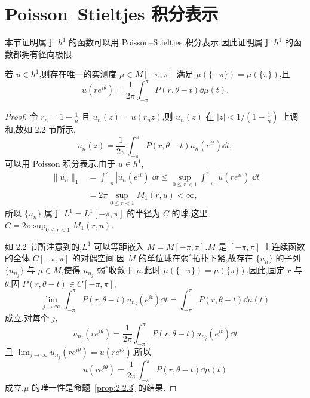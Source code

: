 \section{Poisson--Stieltjes 积分表示}\label{sec:2.4}

本节证明属于 $h^{1}$ 的函数可以用 Poisson--Stieltjes 积分表示.因此证明属于 $h^{1}$ 的函数都拥有径向极限.

\begin{theorem}\label{thm:2.4.1}
若 $u \in h^{1}$,则存在唯一的实测度 $\mu \in M[-\pi, \pi]$ 满足 $\mu(\{-\pi\}) = \mu(\{\pi\})$,且
\begin{equation*}
u(re^{i\theta}) = \frac{1}{2\pi}\int_{-\pi}^{\pi}P(r, \theta - t)\dd\mu(t).
\end{equation*}
\end{theorem}

\begin{proof}
令 $r_{n} = 1 - \frac{1}{n}$ 且 $u_{n}(z) = u(r_{n}z)$,则 $u_{n}(z)$ 在 $|z| < 1/(1 - \frac{1}{n})$ 上调和,故如 2.2 节所示,
\begin{equation*}
u_{n}(z) = \frac{1}{2\pi}\int_{-\pi}^{\pi}P(r, \theta - t)u_{n}(e^{it})\dd t,
\end{equation*}
可以用 Poisson 积分表示.由于 $u \in h^{1}$,
\begin{align*}
\|u_{n}\|_{1} & = \int_{-\pi}^{\pi}|u_{n}(e^{it})|\dd t \leq \sup_{0 \leq r < 1}\int_{-\pi}^{\pi}|u(re^{it})|\dd t \\
& = 2\pi\sup_{0 \leq r < 1}M_{1}(r, u) < \infty,
\end{align*}
所以 $\{u_{n}\}$ 属于 $L^{1} = L^{1}[-\pi, \pi]$ 的半径为 $C$ 的球.这里 $C = 2\pi\sup_{0 \leq r < 1}M_{1}(r, u)$.

如 2.2 节所注意到的,$L^{1}$ 可以等距嵌入 $M = M[-\pi, \pi]$.$M$ 是 $[-\pi, \pi]$ 上连续函数的全体 $C[-\pi, \pi]$ 的对偶空间.因 $M$ 的单位球在弱$^{*}$拓扑下紧,故存在 $\{u_{n}\}$ 的子列 $\{u_{n_{j}}\}$ 与 $\mu \in M$,使得 $u_{n_{j}}$ 弱$^{*}$收敛于 $\mu$.此时 $\mu(\{-\pi\}) = \mu(\{\pi\})$.因此,固定 $r$ 与 $\theta$,因 $P(r, \theta - t) \in C[-\pi, \pi]$,
\begin{equation*}
\lim_{j \rightarrow \infty}\int_{-\pi}^{\pi}P(r, \theta - t)u_{n_{j}}(e^{it})\dd t = \int_{-\pi}^{\pi}P(r, \theta - t)\dd\mu(t)
\end{equation*}
成立.对每个 $j$,
\begin{equation*}
u_{n_{j}}(re^{i\theta}) = \frac{1}{2\pi}\int_{-\pi}^{\pi}P(r, \theta - t)u_{n_{j}}(e^{it})\dd t
\end{equation*}
且 $\lim_{j \rightarrow \infty}u_{n_{j}}(re^{i\theta}) = u(re^{i\theta})$,所以
\begin{equation*}
u(re^{i\theta}) = \frac{1}{2\pi}\int_{-\pi}^{\pi}P(r, \theta - t)\dd\mu(t)
\end{equation*}
成立.$\mu$ 的唯一性是命题~\ref{prop:2.2.3} 的结果.
\end{proof}

